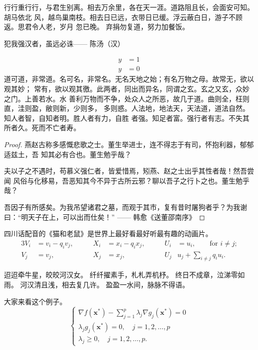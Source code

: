 行行重行行，与君生别离。相去万余里，各在天一涯。道路阻且长，会面安可知。胡马依北
风，越鸟巢南枝。相去日已远，衣带日已缓。浮云蔽白日，游子不顾返。思君令人老，岁月
忽已晚。  弃捐勿复道，努力加餐饭。

\begin{theorem}\label{the:theorem1}
犯我强汉者，虽远必诛\hfill —— 陈汤（汉）
\end{theorem}
\begin{subequations}
\begin{align}
y & = 1 \\
y & = 0
\end{align}
\end{subequations}
道可道，非常道。名可名，非常名。无名天地之始；有名万物之母。故常无，欲以观其妙；
常有，欲以观其徼。此两者，同出而异名，同谓之玄。玄之又玄，众妙之门。上善若水。水
善利万物而不争，处众人之所恶，故几于道。曲则全，枉则直，洼则盈，敝则新，少则多，
多则惑。人法地，地法天，天法道，道法自然。知人者智，自知者明。胜人者有力，自胜
者强。知足者富。强行者有志。不失其所者久。死而不亡者寿。

\begin{proof}
燕赵古称多感慨悲歌之士。董生举进士，连不得志于有司，怀抱利器，郁郁适兹土，吾
知其必有合也。董生勉乎哉？

夫以子之不遇时，苟慕义强仁者，皆爱惜焉，矧燕、赵之士出乎其性者哉！然吾尝闻
风俗与化移易，吾恶知其今不异于古所云邪？聊以吾子之行卜之也。董生勉乎哉？

吾因子有所感矣。为我吊望诸君之墓，而观于其市，复有昔时屠狗者乎？为我谢
曰：“明天子在上，可以出而仕矣！” \hfill —— 韩愈《送董邵南序》
\end{proof}

\begin{corollary}
  四川话配音的《猫和老鼠》是世界上最好看最好听最有趣的动画片。
\begin{alignat}{3}
V_i & =v_i - q_i v_j, & \qquad X_i & = x_i - q_i x_j,
 & \qquad U_i & = u_i,
 \qquad \text{for $i\ne j$;}\label{eq:B}\\
V_j & = v_j, & \qquad X_j & = x_j,
  & \qquad U_j & u_j + \sum_{i\ne j} q_i u_i.
\end{alignat}
\end{corollary}

迢迢牵牛星，皎皎河汉女。
纤纤擢素手，札札弄机杼。
终日不成章，泣涕零如雨。
河汉清且浅，相去复几许。
盈盈一水间，脉脉不得语。

\begin{example}
  大家来看这个例子。
\begin{equation}
  \label{ktc}
  \begin{cases}
    \nabla f(\bm{x}^*) - \sum_{j=1}^p \lambda_j \nabla g_j(\bm{x}^*)
      = 0 \\[0.3cm]
    \lambda_j g_j(\bm{x}^*) = 0, \quad j = 1, 2, \dots, p \\[0.2cm]
    \lambda_j \ge 0, \quad j = 1, 2, \dots, p.
  \end{cases}
\end{equation}
\end{example}

